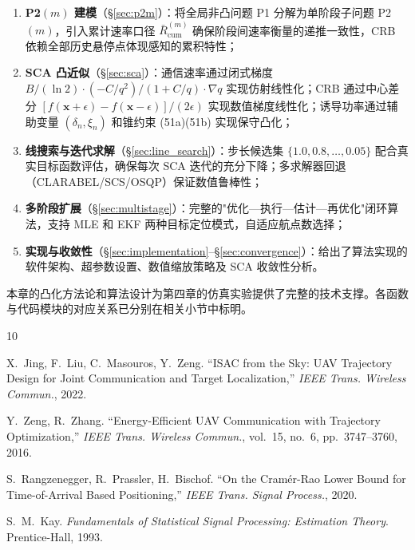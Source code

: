 \begin{enumerate}
    \item \textbf{P2$(m)$ 建模}（\S\ref{sec:p2m}）：将全局非凸问题 P1 分解为单阶段子问题 P2$(m)$，引入累计速率口径 $\bar{R}_{\mathrm{cum}}^{(m)}$ 确保阶段间速率衡量的递推一致性，CRB 依赖全部历史悬停点体现感知的累积特性；
    \item \textbf{SCA 凸近似}（\S\ref{sec:sca}）：通信速率通过闭式梯度 $B/(\ln2)\cdot(-C/q^2)/(1+C/q)\cdot\nabla q$ 实现仿射线性化；CRB 通过中心差分 $[f(\mathbf{x}+\epsilon)-f(\mathbf{x}-\epsilon)]/(2\epsilon)$ 实现数值梯度线性化；诱导功率通过辅助变量 $(\delta_n,\xi_n)$ 和锥约束 (51a)(51b) 实现保守凸化；
    \item \textbf{线搜索与迭代求解}（\S\ref{sec:line_search}）：步长候选集 $\{1.0,0.8,\ldots,0.05\}$ 配合真实目标函数评估，确保每次 SCA 迭代的充分下降；多求解器回退（CLARABEL/SCS/OSQP）保证数值鲁棒性；
    \item \textbf{多阶段扩展}（\S\ref{sec:multistage}）：完整的"优化—执行—估计—再优化"闭环算法，支持 MLE 和 EKF 两种目标定位模式，自适应航点数选择；
    \item \textbf{实现与收敛性}（\S\ref{sec:implementation}--\S\ref{sec:convergence}）：给出了算法实现的软件架构、超参数设置、数值缩放策略及 SCA 收敛性分析。
\end{enumerate}

本章的凸化方法论和算法设计为第四章的仿真实验提供了完整的技术支撑。各函数与代码模块的对应关系已分别在相关小节中标明。

\begin{thebibliography}{10}

X.~Jing, F.~Liu, C.~Masouros, Y.~Zeng.
``ISAC from the Sky: UAV Trajectory Design for Joint Communication and Target Localization,''
\textit{IEEE Trans. Wireless Commun.}, 2022.

Y.~Zeng, R.~Zhang.
``Energy-Efficient UAV Communication with Trajectory Optimization,''
\textit{IEEE Trans. Wireless Commun.}, vol.~15, no.~6, pp.~3747--3760, 2016.

S.~Rangzenegger, R.~Prassler, H.~Bischof.
``On the Cram\'{e}r-Rao Lower Bound for Time-of-Arrival Based Positioning,''
\textit{IEEE Trans. Signal Process.}, 2020.

S.~M.~Kay.
\textit{Fundamentals of Statistical Signal Processing: Estimation Theory}.
Prentice-Hall, 1993.

\end{thebibliography}
